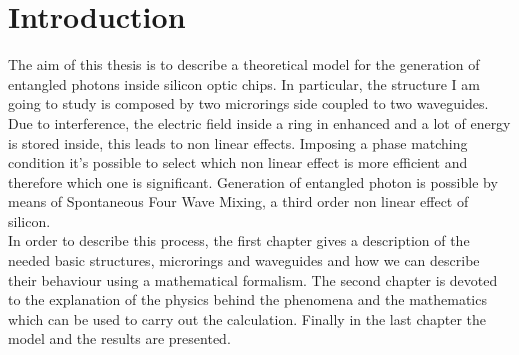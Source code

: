 \chapter{Introduction}
The aim of this thesis is to describe a theoretical model for the generation of entangled photons inside silicon optic chips. In particular, the structure I am going to study is composed by two microrings side coupled to two waveguides. Due to interference, the electric field inside a ring in enhanced and a lot of energy is stored inside, this leads to non linear effects. Imposing a phase matching condition it's possible to select which non linear effect is more efficient and therefore which one is significant. Generation of entangled photon is possible by means of Spontaneous Four Wave Mixing, a third order non linear effect of silicon.\\
In order to describe this process, the first chapter gives a description of the needed basic structures, microrings and waveguides and how we can describe their behaviour using a mathematical formalism. The second chapter is devoted to the explanation of the physics behind the phenomena and the mathematics which can be used to carry out the calculation. Finally in the last chapter the model and the results are presented.
